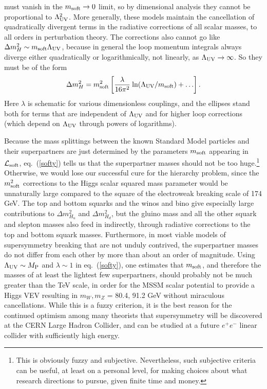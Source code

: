 \documentclass[11pt]{article}
\def\beq{\begin{eqnarray}}
\def\eeq{\end{eqnarray}}
\def\lagr{{\cal L}}
\def\MPlanck{M_{\rm P}}
\begin{document}
must vanish in the $m_{\rm soft}\rightarrow 0$ limit, so by dimensional
analysis they cannot be proportional to $\Lambda_{\rm UV}^2$. More
generally, these models maintain the cancellation of quadratically
divergent terms in the radiative corrections of all scalar masses, to all
orders in perturbation theory. The corrections also cannot go like $\Delta
m_H^2 \sim m_{\rm soft} \Lambda_{\rm UV}$, because in general the loop
momentum integrals always diverge either quadratically or logarithmically,
not linearly, as $\Lambda_{\rm UV} \rightarrow \infty$. So they must be of
the form
\beq
\Delta m_{H}^2 =
m_{\rm soft}^2
\left [{\lambda\over 16 \pi^2}\> {\rm ln}(\Lambda_{\rm UV}/m_{\rm soft})
+ \ldots \right ].
\label{softy}
\eeq
Here $\lambda$ is schematic for various dimensionless couplings, and the
ellipses stand both for terms that are independent of $\Lambda_{\rm UV}$
and for higher loop corrections (which depend on $\Lambda_{\rm UV}$
through powers of logarithms). 

Because the mass splittings between the known Standard Model particles and
their superpartners are just determined by the parameters $m_{\rm soft}$
appearing in $\lagr_{\rm soft}$, eq.~(\ref{softy}) tells us that the
superpartner masses should not be too huge.\footnote{This is 
obviously fuzzy and subjective. Nevertheless, such subjective criteria can be useful,
at least on a personal level, for making choices about 
what research directions to pursue, given finite time and money.} 
Otherwise, we would lose our
successful cure for the hierarchy problem, since the $m_{\rm soft}^2$
corrections to the Higgs scalar squared mass parameter would be
unnaturally large compared to the square of the electroweak breaking scale
of 174 GeV. The top and bottom squarks and the winos and bino give
especially large contributions to $\Delta m_{H_u}^2$ and $\Delta
m_{H_d}^2$, but the gluino mass and all the other squark and slepton
masses also feed in indirectly, through radiative corrections to the top
and bottom squark masses. Furthermore, in most viable models of
supersymmetry breaking that are not unduly contrived, the superpartner
masses do not differ from each other by more than about an order of
magnitude. Using $\Lambda_{\rm UV} \sim \MPlanck$ and $\lambda \sim 1$ in
eq.~(\ref{softy}), one estimates that $m_{\rm soft}$, and therefore the masses
of at least the lightest few superpartners, should probably not be much 
greater than the TeV scale, in order for the MSSM scalar potential 
to provide a Higgs VEV resulting in $m_W,m_Z$ = 80.4, 91.2 GeV without 
miraculous cancellations. While this is a fuzzy criterion, it
is the best reason for the continued optimism among many theorists that
supersymmetry will be discovered at the CERN
Large Hadron Collider, and can be studied at a future $e^+ e^-$ linear
collider with sufficiently high energy. 
\end{document}
